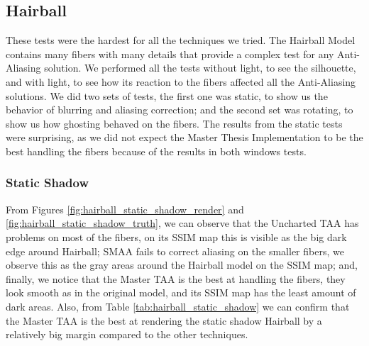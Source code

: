 \documentclass{cslthse-msc}
\begin{document}
\subsection{Hairball}
These tests were the hardest for all the techniques we tried. The Hairball Model contains many fibers with many details that provide a complex test for any Anti-Aliasing solution. We performed all the tests without light, to see the silhouette, and with light, to see how its reaction to the fibers affected all the Anti-Aliasing solutions. We did two sets of tests, the first one was static, to show us the behavior of blurring and aliasing correction; and the second set was rotating, to show us how ghosting behaved on the fibers. The results from the static tests were surprising, as we did not expect the Master Thesis Implementation to be the best handling the fibers because of the results in both windows tests.
\subsubsection{Static Shadow}
From Figures \ref{fig:hairball_static_shadow_render} and \ref{fig:hairball_static_shadow_truth}, we can observe that the Uncharted TAA has problems on most of the fibers, on its SSIM map this is visible as the big dark edge around Hairball; SMAA fails to correct aliasing on the smaller fibers, we observe this as the gray areas around the Hairball model on the SSIM map; and, finally, we notice that the Master TAA is the best at handling the fibers, they look smooth as in the original model, and its SSIM map has the least amount of dark areas. Also, from Table \ref{tab:hairball_static_shadow} we can confirm that the Master TAA is the best at rendering the static shadow Hairball by a relatively big margin compared to the other techniques.
\end{document}
